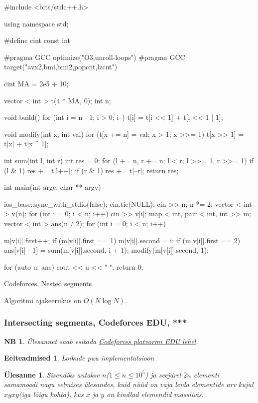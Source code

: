 \documentclass{trkut}
\newtheorem*{prereq}{Eelteadmised}
\newtheorem*{extra}{NB}
\newtheorem*{Text}{Ülesanne}
\begin{document}
\begin{cclol}
#include <bits/stdc++.h>

using namespace std;

#define cint
const int

#pragma GCC optimize("O3,unroll-loops")
#pragma GCC target("avx2,bmi,bmi2,popcnt,lzcnt")

cint MA = 2e5 + 10;

vector < int > t(4 * MA, 0);
int n;

void build() {
  for (int i = n - 1; i > 0; i--) t[i] = t[i << 1] + t[i << 1 | 1];
}

void modify(int x, int val) {
  for (t[x += n] = val; x > 1; x >>= 1) t[x >> 1] = t[x] + t[x ^ 1];
}

int sum(int l, int r) {
  int res = 0;
  for (l += n, r += n; l < r; l >>= 1, r >>= 1) {
    if (l & 1) res += t[l++];
    if (r & 1) res += t[--r];
  }
  return res;
}

int main(int argc, char ** argv) {
  ios_base::sync_with_stdio(false);
  cin.tie(NULL);
  cin >> n;
  n *= 2;
  vector < int > v(n);
  for (int i = 0; i < n; i++) {
    cin >> v[i];
  }
  map < int, pair < int, int >> m;
  vector < int > ans(n / 2);
  for (int i = 0; i < n; i++) {

    m[v[i]].first++;
    if (m[v[i]].first == 1) m[v[i]].second = i;
    if (m[v[i]].first == 2) {
      ans[v[i] - 1] = sum(m[v[i]].second, i + 1);
      modify(m[v[i]].second, 1);
    }
  }
  for (auto u: ans) {
    cout << u << " ";
  }
  return 0;
}
    \end{cclol}
    \begin{kk}[H]
    \caption{Codeforces, Nested segments}%
    \end{kk}
Algoritmi ajakeerukus on $O(N\log N)$.


\subsubsection{Intersecting segments, Codeforces EDU, ***}
\begin{extra}
Ülesannet saab esitada \href{https://codeforces.com/edu/course/2/lesson/4/3/practice/contest/274545/problem/D}{Codeforces platvormi EDU lehel}.
\end{extra}

\begin{prereq}
Loikude puu implementatsioon
\end{prereq}
\begin{Text}
Sisendiks antakse $n$($1\leq n \leq 10^5$) ja seejärel $2n$ elementi samamoodi nagu eelmises ülesandes, kuid nüüd on vaja leida elementide arv kujul $xyxy$(iga lõigu kohta), kus $x$ ja $y$ on kindlad elemendid massiivis.

\parencite{inseg}
\end{Text}
\end{document}
